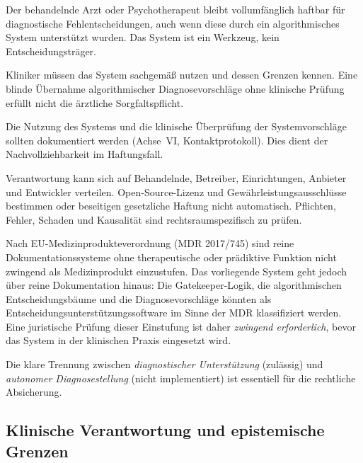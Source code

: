 \documentclass[11pt,a4paper]{article}
\begin{document}
\begin{description}[style=nextline, leftmargin=1.5cm, font=\bfseries]
\item[Behandler-Haftung bleibt bestehen] Der behandelnde Arzt oder Psychotherapeut bleibt vollumf\"anglich haftbar f\"ur diagnostische Fehlentscheidungen, auch wenn diese durch ein algorithmisches System unterst\"utzt wurden. Das System ist ein Werkzeug, kein Entscheidungstr\"ager.
\item[Sorgfaltspflicht bei Systemnutzung] Kliniker m\"ussen das System sachgem\"a\ss{} nutzen und dessen Grenzen kennen. Eine blinde \"Ubernahme algorithmischer Diagnosevorschl\"age ohne klinische Pr\"ufung erf\"ullt nicht die \"arztliche Sorgfaltspflicht.
\item[Dokumentationspflicht] Die Nutzung des Systems und die klinische \"Uberpr\"ufung der Systemvorschl\"age sollten dokumentiert werden (Achse~VI, Kontaktprotokoll). Dies dient der Nachvollziehbarkeit im Haftungsfall.
\item[Verantwortung und Produkthaftung] Verantwortung kann sich auf Behandelnde, Betreiber, Einrichtungen, Anbieter und Entwickler verteilen. Open-Source-Lizenz und Gew\"ahrleistungsausschl\"usse bestimmen oder beseitigen gesetzliche Haftung nicht automatisch. Pflichten, Fehler, Schaden und Kausalit\"at sind rechtsraumspezifisch zu pr\"ufen.
\item[Medizinprodukt-Einstufung bedarf juristischer Kl\"arung] Nach EU-Medizinprodukteverordnung (MDR 2017/745) sind reine Dokumentationssysteme ohne therapeutische oder pr\"adiktive Funktion nicht zwingend als Medizinprodukt einzustufen. Das vorliegende System geht jedoch \"uber reine Dokumentation hinaus: Die Gatekeeper-Logik, die algorithmischen Entscheidungsb\"aume und die Diagnosevorschl\"age k\"onnten als Entscheidungsunterst\"utzungssoftware im Sinne der MDR klassifiziert werden. Eine juristische Pr\"ufung dieser Einstufung ist daher \textit{zwingend erforderlich}, bevor das System in der klinischen Praxis eingesetzt wird.
\end{description}

Die klare Trennung zwischen \textit{diagnostischer Unterst\"utzung} (zul\"assig) und \textit{autonomer Diagnosestellung} (nicht implementiert) ist essentiell f\"ur die rechtliche Absicherung.

\subsection{Klinische Verantwortung und epistemische Grenzen}
\end{document}
